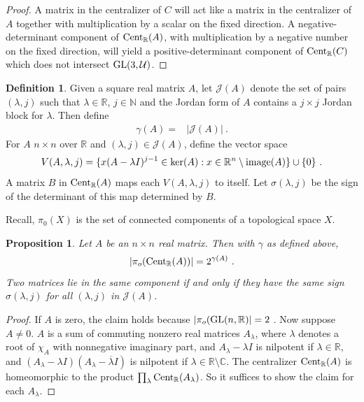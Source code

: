 \documentclass{amsart}
\newtheorem{proposition}[theorem]{Proposition}
\theoremstyle{definition}
\newtheorem{definition}[theorem]{Definition}
\theoremstyle{remark}
\newcommand{\za}{\textnormal{Cent}_{\mathbb R}(A)}
\numberwithin{equation}{section}
\begin{document}
{{\begin{proof}
A matrix in the centralizer of  $C$ will act like a matrix in the centralizer 
of $A$ together with multiplication by a  scalar on the 
fixed direction. A negative-determinant component of 
$\textnormal{Cent}_{\mathbb R}(A)$, with multiplication by a negative 
number on the fixed direction, will yield a positive-determinant 
component  of $\textnormal{Cent}_{\mathbb R}(C)$ which does not intersect 
$\textnormal{GL}(3,\mathcal U)$. 
\end{proof} 


\begin{definition} \label{gamma}
Given a square real matrix $A$, 
let $\mathcal J(A)$ denote the set of pairs 
$(\lambda, j)$ such that $ \lambda \in \mathbb R$, 
$j\in \mathbb N$ and the Jordan form of $A$ contains a 
$j\times j$ Jordan block for $\lambda$. Then define   
\begin{align*} 
\gamma (A) =& |\mathcal J(A)| 
\ .
\end{align*} 
For $A$ $n\times n$ over $\mathbb R$ 
and $(\lambda ,j)\in \mathcal J(A)$, define 
the vector space 
\[
V(A,\lambda, j) =
\{ x(A-\lambda I)^{j-1} \in \textnormal{ker}(A): 
x\in \mathbb R^n\setminus \textnormal{image}(A)\}\cup \{0\} \ .
\]
A matrix $B$ in $\za$ maps each  
$V(A,\lambda, j)$ to itself. Let $\sigma (\lambda ,j)$ be the sign of the
determinant of this map determined by $B$. 
\end{definition} 

Recall, $\pi_0(X)$ is the set of connected components of a topological 
space $X$. 
\begin{proposition} \label{gammabound}
Let $A$ be an $n\times n$ real matrix. Then with $\gamma $ as defined above, 
\[
|\pi_o(\za )| = 2^{\gamma (A)} \ . 
\] 
Two matrices lie in the same component if and only if 
they have the same sign $\sigma(\lambda ,j)$ for all
$(\lambda ,j)$ in $\mathcal J(A)$.
\end{proposition} 
\begin{proof} 
If $A$ is zero, the claim holds because 
$|\pi_o(\textnormal{GL}(n,\mathbb R )| = 2 \ $. Now suppose $A\neq 0$. 
$A$ is a  sum 
of commuting nonzero real matrices $A_{\lambda}$, where $\lambda $ denotes 
a root of $\chi_A$ with nonnegative imaginary part, and 
$A_{\lambda}-\lambda I$ is nilpotent if $ \lambda \in \mathbb R$,  
and $(A_{\lambda}-\lambda I)(A_{\lambda}-\overline{\lambda }I)$ 
is nilpotent if $\lambda \in \mathbb R \setminus \mathbb C$. The 
centralizer $\za$ is homeomorphic to the product 
$\prod_{\lambda}\textnormal{Cent}_{\mathbb R}(A_{\lambda})$. So it 
suffices to show the claim for each $A_{\lambda}$. 


\end{proof}}}
\end{document}

